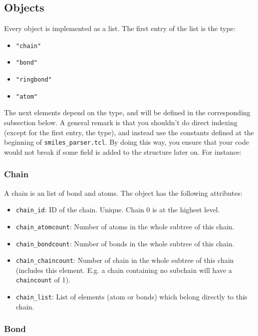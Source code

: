\documentclass[a4paper, 11pt]{article}
\begin{document}
\subsection{Objects}
Every object is implemented as a list. The first entry of the list is the type:
\begin{itemize}
    \item \texttt{"chain"}
    \item \texttt{"bond"}
    \item \texttt{"ringbond"}
    \item \texttt{"atom"}
\end{itemize}

The next elements depend on the type, and will be defined in the corresponding subsection below. A general remark is that you shouldn't do direct indexing (except for the first entry, the type), and instead use the constants defined at the beginning of \texttt{smiles\_parser.tcl}. By doing this way, you ensure that your code would not break if some field is added to the structure later on. For instance:



\subsubsection{Chain}\label{subsubsec:chain}

A chain is an list of bond and atoms. The object has the following attributes:
\begin{itemize}
    \item \texttt{chain\_id}: ID of the chain. Unique. Chain 0 is at the highest level.
    \item \texttt{chain\_atomcount}: Number of atoms in the whole subtree of this chain.
    \item \texttt{chain\_bondcount}: Number of bonds in the whole subtree of this chain.
    \item \texttt{chain\_chaincount}: Number of chain in the whole subtree of this chain (includes this element. E.g. a chain containing no subchain will have a \texttt{chaincount} of 1).
    \item \texttt{chain\_list}: List of elements (atom or bonds) which belong directly to this chain.
\end{itemize}

\subsubsection{Bond}\label{subsubsec:bond}
\end{document}
